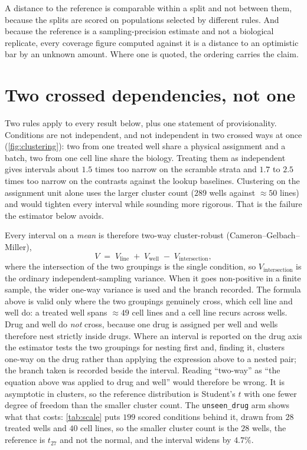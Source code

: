 \begin{scopelimit}
A distance to the reference is comparable within a split and not between them,
because the splits are scored on populations selected by different rules. And
because the reference is a sampling-precision estimate and not a biological
replicate, every coverage figure computed against it is a distance to an
optimistic bar by an unknown amount. Where one is quoted, the ordering carries
the claim.
\end{scopelimit}

\section{Two crossed dependencies, not one}
\label{sec:apparatus-clusters}

Two rules apply to every result below, plus one statement of provisionality.
Conditions are not independent, and not independent in two crossed ways at once
(\cref{fig:clustering}): two from one treated well share a physical assignment
and a batch, two from one cell line share the biology. Treating them as
independent gives intervals about $1.5$ times too narrow on the scramble
strata and $1.7$ to $2.5$ times too narrow on the contrasts against the lookup
baselines. Clustering on the assignment unit alone uses the larger cluster
count ($289$ wells against $\approx 50$ lines) and would tighten every interval
while sounding more rigorous. That is the failure the estimator below avoids.



Every interval on a \emph{mean} is therefore two-way cluster-robust
(Cameron--Gelbach--Miller),
\begin{equation}
 V \;=\; V_{\textrm{line}} \;+\; V_{\textrm{well}} \;-\; V_{\textrm{intersection}},
\end{equation}
where the intersection of the two groupings is the single condition, so
$V_{\textrm{intersection}}$ is the ordinary independent-sampling variance. When
it goes non-positive in a finite sample, the wider one-way variance is used and
the branch recorded. The formula above is valid only where the two groupings
genuinely cross, which cell line and well do: a treated well spans
$\approx 49$ cell lines and a cell line recurs across wells. Drug and well do
\emph{not} cross, because one drug is assigned per well and wells therefore nest
strictly inside drugs. Where an interval is reported on the drug axis the
estimator tests the two groupings for nesting first and, finding it, clusters
one-way on the drug rather than applying the expression above to a nested pair;
the branch taken is recorded beside the interval. Reading ``two-way'' as
``the equation above was applied to drug and well'' would therefore be wrong.
It is asymptotic in clusters, so the reference distribution
is Student's $t$ with one fewer degree of freedom than the smaller cluster
count. The \texttt{unseen\_drug} arm shows what that costs: \cref{tab:scale}
puts $199$ scored conditions behind it, drawn from $28$ treated wells and $40$
cell lines, so the smaller cluster count is the $28$ wells, the reference is
$t_{27}$ and not the normal, and the interval widens by $4.7\%$.

